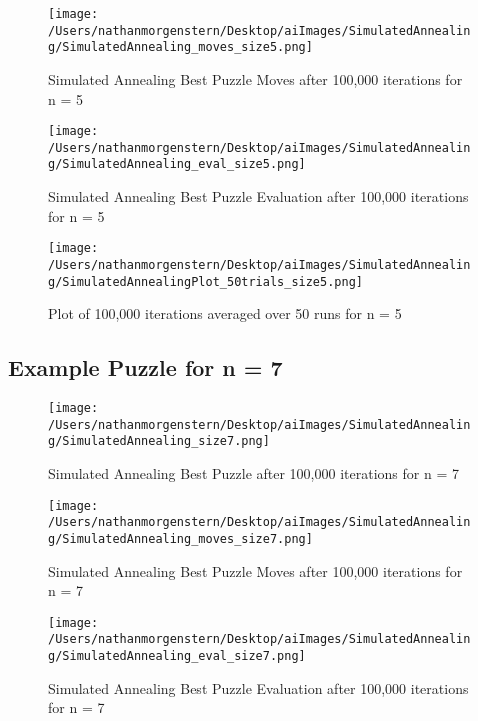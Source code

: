 \documentclass{report}
\begin{document}
	\begin{figure}[H]
	\centering
	\texttt{[image: /Users/nathanmorgenstern/Desktop/aiImages/SimulatedAnnealing/SimulatedAnnealing\_moves\_size5.png]}
	\caption{Simulated Annealing Best Puzzle Moves after 100,000 iterations for n = 5} 
	\label{fig: Simulated Annealing Best Puzzle Moves after 100,000 iterations for n = 5}
	\end{figure}

	\begin{figure}[H]
	\centering
	\texttt{[image: /Users/nathanmorgenstern/Desktop/aiImages/SimulatedAnnealing/SimulatedAnnealing\_eval\_size5.png]}
	\caption{Simulated Annealing Best Puzzle Evaluation after 100,000 iterations for n = 5} 
	\label{fig: Simulated Annealing Best Puzzle Evaluation after 100,000 iterations for n = 5} 
	\end{figure}

	\begin{figure}[H]
	\centering
	\texttt{[image: /Users/nathanmorgenstern/Desktop/aiImages/SimulatedAnnealing/SimulatedAnnealingPlot\_50trials\_size5.png]}
	\caption{Plot of 100,000 iterations averaged over 50 runs for n = 5}
	\label{fig: Plot of 100,000 iterations averaged over 50 runs for n = 5}
	\end{figure}

\subsection{Example Puzzle for n = 7}

	\begin{figure}[H]
	\centering
	\texttt{[image: /Users/nathanmorgenstern/Desktop/aiImages/SimulatedAnnealing/SimulatedAnnealing\_size7.png]}
	\caption{Simulated Annealing Best Puzzle after 100,000 iterations for n = 7} 
	\label{fig: Simulated Annealing Best Puzzle after 100,000 iterations for n = 7}
	\end{figure}
	
	\begin{figure}[H]
	\centering
	\texttt{[image: /Users/nathanmorgenstern/Desktop/aiImages/SimulatedAnnealing/SimulatedAnnealing\_moves\_size7.png]}
	\caption{Simulated Annealing Best Puzzle Moves after 100,000 iterations for n = 7} 
	\label{fig: Simulated Annealing Best Puzzle Moves after 100,000 iterations for n = 7}
	\end{figure}

	\begin{figure}[H]
	\centering
	\texttt{[image: /Users/nathanmorgenstern/Desktop/aiImages/SimulatedAnnealing/SimulatedAnnealing\_eval\_size7.png]}
	\caption{Simulated Annealing Best Puzzle Evaluation after 100,000 iterations for n = 7} 
	\label{fig: Simulated Annealing Best Puzzle Evaluation after 100,000 iterations for n = 7} 
	\end{figure}
\end{document}
